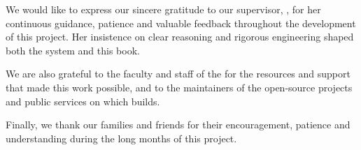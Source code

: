 
We would like to express our sincere gratitude to our supervisor, \Supervisor, for her
continuous guidance, patience and valuable feedback throughout the development of this
project. Her insistence on clear reasoning and rigorous engineering shaped both the system
and this book.

We are also grateful to the faculty and staff of the \Department{} for the resources and
support that made this work possible, and to the maintainers of the open-source projects and
public services on which \ProjectName{} builds.

Finally, we thank our families and friends for their encouragement, patience and
understanding during the long months of this project.
\clearpage

